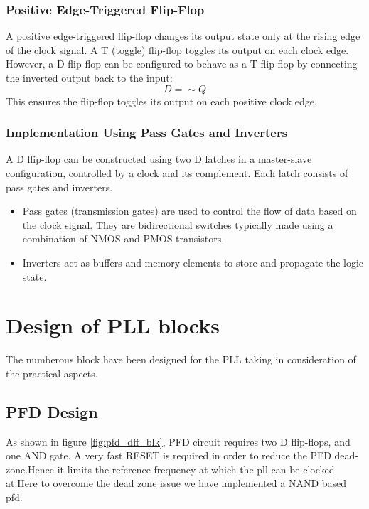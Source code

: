 \subsubsection*{Positive Edge-Triggered Flip-Flop}
A positive edge-triggered flip-flop changes its output state only at the rising edge of the clock signal. A T (toggle) flip-flop toggles its output on each clock edge. However, a D flip-flop can be configured to behave as a T flip-flop by connecting the inverted output back to the input:
\[
D = \sim Q
\]
This ensures the flip-flop toggles its output on each positive clock edge.
\subsubsection*{Implementation Using Pass Gates and Inverters}
A D flip-flop can be constructed using two D latches in a master-slave configuration, controlled by a clock and its complement. Each latch consists of pass gates and inverters.
\begin{itemize}
    \item Pass gates (transmission gates) are used to control the flow of data based on the clock signal. They are bidirectional switches typically made using a combination of NMOS and PMOS transistors.
    \item Inverters act as buffers and memory elements to store and propagate the logic state.
\end{itemize}
\section{Design of PLL blocks}
The numberous block have been designed for the PLL taking in consideration of the practical aspects.
\subsection{PFD Design}
As shown in figure \ref{fig:pfd_dff_blk}, PFD circuit requires two D flip-flops, and one AND gate. A very fast RESET is required in order to reduce the PFD dead-zone.Hence it limits the reference frequency at which the pll can be clocked at.Here to overcome the dead zone issue we have implemented a NAND based pfd.

